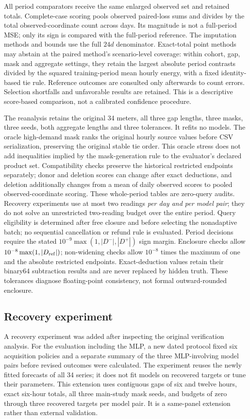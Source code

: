\documentclass[12pt]{article}
\begin{document}
All period comparators receive the same enlarged observed set and retained
totals. Complete-case scoring pools observed paired-loss sums and divides
by the total observed-coordinate count across days. Its magnitude is not
a full-period MSE; only its sign is compared with the full-period reference.
The imputation methods and bounds use the full $24d$ denominator. Exact-total
point methods may abstain at the paired method's scenario-level coverage:
within cohort, gap, mask and aggregate settings, they retain the largest
absolute period contrasts divided by the squared training-period mean
hourly energy, with a fixed identity-based tie rule.
Reference outcomes are consulted only afterwards to count errors. Selection
shortfalls and unfavorable results are retained. This is a descriptive
score-based comparison, not a calibrated confidence procedure.

The reanalysis retains the original 34 meters, all three gap lengths,
three masks, three seeds, both aggregate lengths and three tolerances.
It refits no models. The oracle high-demand mask ranks the original hourly
source values before CSV serialization, preserving the original stable
tie order. This oracle stress does not add inequalities implied by the
mask-generation rule to the evaluator's declared product set.
Compatibility checks preserve the historical
restricted endpoints separately; donor and deletion scores can change after
exact deductions, and deletion additionally changes from a mean of daily
observed scores to pooled observed-coordinate scoring.
These whole-period tables are zero-query audits. Recovery experiments use
at most two readings \emph{per day and per model pair}; they do not solve
an unrestricted two-reading budget over the entire period.
Query eligibility is determined after free closure and before selecting the
nonadaptive batch; no sequential cancellation or refund rule is evaluated.
Period decisions require the stated $10^{-9}\max(1,|D^-|,|D^+|)$
sign margin. Enclosure checks allow $10^{-8}\max(1,|D_{\rm ref}|)$;
non-widening checks allow $10^{-8}$ times the maximum of one and the
absolute restricted endpoints. Exact-deduction values retain their
binary64 subtraction results and are never replaced by hidden truth.
These tolerances diagnose floating-point consistency, not formal
outward-rounded enclosure.


\subsection{Recovery experiment}
A recovery experiment was added after inspecting the original verification
analysis. For the evaluation including the MLP, a new dated protocol fixed six
acquisition policies and a separate summary of the three MLP-involving
model pairs before revised outcomes were calculated. The experiment reuses
the newly fitted forecasts of all 34 series; it does not fit models on
recovered targets or tune their parameters.
This extension uses contiguous gaps of six and twelve hours, exact six-hour
totals, all three main-study mask seeds, and budgets of zero through three
recovered targets per model pair. It is a same-panel extension rather than
external validation.
\end{document}
